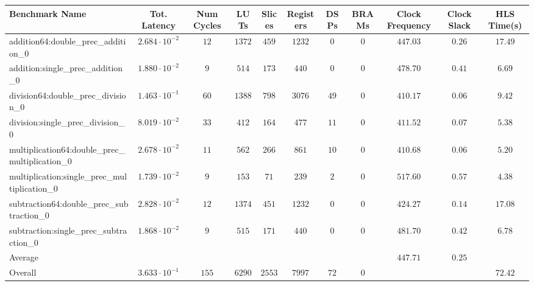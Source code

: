 \begin{tabular}{|l|c|c|c|c|c|c|c|c|c|c|}
\hline
Benchmark Name                                   & Tot. Latency            & Num Cycles & LUTs     & Slices   & Registers & DSPs   & BRAMs & Clock Frequency & Clock Slack & HLS Time(s) \\
\hline
addition64:double\_prec\_addition\_0             & $ 2.684 \cdot 10^{-2} $ & $ 12     $ & $ 1372 $ & $ 459  $ & $ 1232  $ & $ 0  $ & $ 0 $ & $ 447.03      $ & $ 0.26    $ & $ 17.49   $ \\
addition:single\_prec\_addition\_0               & $ 1.880 \cdot 10^{-2} $ & $ 9      $ & $ 514  $ & $ 173  $ & $ 440   $ & $ 0  $ & $ 0 $ & $ 478.70      $ & $ 0.41    $ & $ 6.69    $ \\
division64:double\_prec\_division\_0             & $ 1.463 \cdot 10^{-1} $ & $ 60     $ & $ 1388 $ & $ 798  $ & $ 3076  $ & $ 49 $ & $ 0 $ & $ 410.17      $ & $ 0.06    $ & $ 9.42    $ \\
division:single\_prec\_division\_0               & $ 8.019 \cdot 10^{-2} $ & $ 33     $ & $ 412  $ & $ 164  $ & $ 477   $ & $ 11 $ & $ 0 $ & $ 411.52      $ & $ 0.07    $ & $ 5.38    $ \\
multiplication64:double\_prec\_multiplication\_0 & $ 2.678 \cdot 10^{-2} $ & $ 11     $ & $ 562  $ & $ 266  $ & $ 861   $ & $ 10 $ & $ 0 $ & $ 410.68      $ & $ 0.06    $ & $ 5.20    $ \\
multiplication:single\_prec\_multiplication\_0   & $ 1.739 \cdot 10^{-2} $ & $ 9      $ & $ 153  $ & $ 71   $ & $ 239   $ & $ 2  $ & $ 0 $ & $ 517.60      $ & $ 0.57    $ & $ 4.38    $ \\
subtraction64:double\_prec\_subtraction\_0       & $ 2.828 \cdot 10^{-2} $ & $ 12     $ & $ 1374 $ & $ 451  $ & $ 1232  $ & $ 0  $ & $ 0 $ & $ 424.27      $ & $ 0.14    $ & $ 17.08   $ \\
subtraction:single\_prec\_subtraction\_0         & $ 1.868 \cdot 10^{-2} $ & $ 9      $ & $ 515  $ & $ 171  $ & $ 440   $ & $ 0  $ & $ 0 $ & $ 481.70      $ & $ 0.42    $ & $ 6.78    $ \\
\hline
Average                                          & $                     $ & $        $ & $      $ & $      $ & $       $ & $    $ & $   $ & $ 447.71      $ & $ 0.25    $ & $         $ \\
\hline
Overall                                          & $ 3.633 \cdot 10^{-1} $ & $ 155    $ & $ 6290 $ & $ 2553 $ & $ 7997  $ & $ 72 $ & $ 0 $ & $             $ & $         $ & $ 72.42   $ \\
\hline
\end{tabular}
